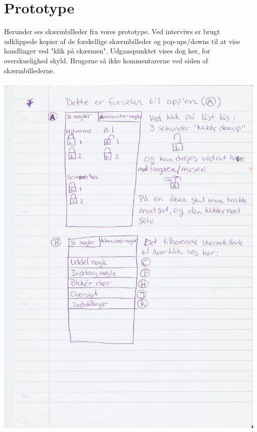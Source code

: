 \documentclass[a4paper,12pt]{article}
\begin{document}
\section{Prototype}

Herunder ses skærmbilleder fra vores prototype. Ved interviws er brugt udklippede kopier af de forskellige skærmbilleder og pop-ups/downs til at vise handlinger ved "klik på skærmen". Udganspunktet vises dog her, for overskuelighed skyld. Brugerne så ikke kommentarerne ved siden af skærmbillederne.
\\ \\
\includegraphics[width=\textwidth]{proto/AB.jpg}
\end{document}
